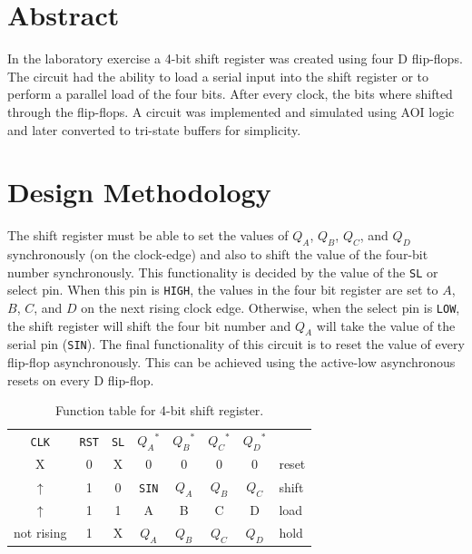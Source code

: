\documentclass[CMPE]{KGCOEReport}
\begin{document}
\maketitle

\section*{Abstract}

In the laboratory exercise a 4-bit shift register was created using four D flip-flops. The circuit had the ability to load a serial input into the shift register or to perform a parallel load of the four bits. After every clock, the bits where shifted through the flip-flops. A circuit was implemented and simulated using AOI logic and later converted to tri-state buffers for simplicity.

\section*{Design Methodology}

The shift register must be able to set the values of $Q_A$, $Q_B$, $Q_C$, and $Q_D$ synchronously (on the clock-edge) and also to shift the value of the four-bit number synchronously. This functionality is decided by the value of the \texttt{SL} or select pin. When this pin is \texttt{HIGH}, the values in the four bit register are set to $A$, $B$, $C$, and $D$ on the next rising clock edge. Otherwise, when the select pin is \texttt{LOW}, the shift register will shift the four bit number and $Q_A$ will take the value of the serial pin (\texttt{SIN}). The final functionality of this circuit is to reset the value of every flip-flop asynchronously. This can be achieved using the active-low asynchronous resets on every D flip-flop. 

\begin{table}[h!]
\renewcommand{\arraystretch}{1.2}
\setlength{\tabcolsep}{12pt}
\caption{Function table for 4-bit shift register.}
\begin{center}
\begin{tabular}{|c|c|c||c|c|c|c|l}
\cline{1-7}
\texttt{CLK} & \texttt{RST} & \texttt{SL} & ${Q_A}^*$ & ${Q_B}^*$ & ${Q_C}^*$ & ${Q_D}^*$ & \\\cline{1-7}
X & 0 & X & 0 & 0 & 0 & 0 & reset \\\cline{1-7}
$\uparrow$ & 1 & 0 & \texttt{SIN} & $Q_A$ & $Q_B$ & $Q_C$ & shift \\\cline{1-7}
$\uparrow$ & 1 & 1 & A & B & C & D & load \\\cline{1-7}
not rising & 1 & X & $Q_A$ & $Q_B$ & $Q_C$ & $Q_D$ & hold \\\cline{1-7}
\end{tabular}
\end{center}
\label{tab:func}
\end{table}
\end{document}
